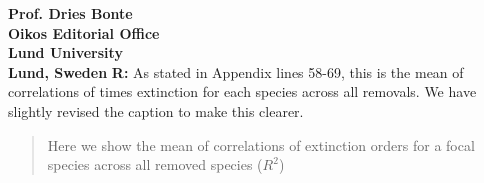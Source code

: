 \documentclass[12pt]{letter}
\begin{document}
\begin{letter}{\bf Prof. Dries Bonte\\
Oikos Editorial Office \\
Lund University \\
Lund, Sweden}
      \textbf{R:} As stated in Appendix lines 58-69, this is the mean of correlations of times extinction for each species across all removals. We have slightly revised the caption to make this clearer.


      \begin{quotation}
        Here we show the mean of correlations of extinction orders for a focal species across all removed species ($R^2$)
      \end{quotation}


\end{letter}

\clearpage
     
\end{document}
